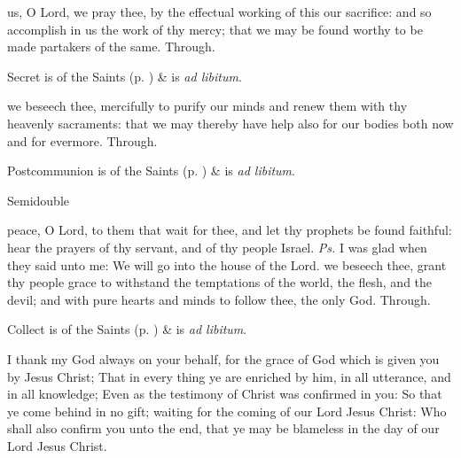 
\secret
{} us, O Lord, we pray thee, by the effectual working of this our sacrifice: and so accomplish in us the work of thy mercy; that we may be found worthy to be made partakers of the same. Through.
\begin{rubric}
     Secret is of the Saints (p. \pageref{SPSaints}) \&  is \emph{ad libitum}.
\end{rubric}

\postcommunion
{} we beseech thee, mercifully to purify our minds and renew them with thy heavenly sacraments: that we may thereby have help also for our bodies both now and for evermore. Through.
\begin{rubric}
     Postcommunion is of the Saints (p. \pageref{SPSaints}) \&  is \emph{ad libitum}.
\end{rubric}


\begin{inhead}
{Semidouble}
\end{inhead}

\properantiphonfix

\introit
{} peace, O Lord, to them that wait for thee, and let thy prophets be found faithful: hear the prayers of thy servant, and of thy people Israel. \textit{Ps.} I was glad when they said unto me: We will go into the house of the Lord.
\collect
{} we beseech thee, grant thy people grace to withstand the temptations of the world, the flesh, and the devil; and with pure hearts and minds to follow thee, the only God. Through.
\begin{rubric}
     Collect is of the Saints (p. \pageref{SPSaints}) \&  is \emph{ad libitum}.
\end{rubric}

 I thank my God always on your behalf, for the grace of God which is given you by Jesus Christ; That in every thing ye are enriched by him, in all utterance, and in all knowledge; Even as the testimony of Christ was confirmed in you: So that ye come behind in no gift; waiting for the coming of our Lord Jesus Christ: Who shall also confirm you unto the end, that ye may be blameless in the day of our Lord Jesus Christ.

